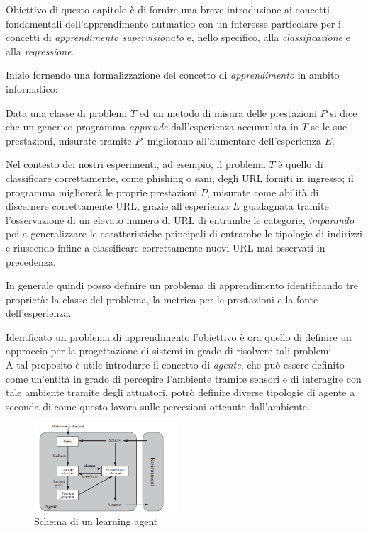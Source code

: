 \documentclass[../../main.tex]{subfiles}
\begin{document}
    Obiettivo di questo capitolo è di fornire una breve introduzione ai concetti fondamentali dell'apprendimento autmatico con un interesse particolare per i concetti di \textit{apprendimento supervisionato} e, nello specifico, alla \textit{classificazione} e alla \textit{regressione}.

    Inizio fornendo una formalizzazione del concetto di \textit{apprendimento} in ambito informatico:
    
    Data una classe di problemi $T$ ed un metodo di misura delle prestazioni $P$ si dice che un generico programma \textit{apprende} dall'esperienza accumulata in $T$ se le sue prestazioni, misurate tramite $P$, migliorano all'aumentare dell'esperienza $E$. \cite{Mitchell97}

    Nel contesto dei nostri esperimenti, ad esempio, il problema $T$ è quello di classificare correttamente, come phishing o sani, degli URL forniti in ingresso; il programma migliorerà le proprie prestazioni $P$, misurate come abilità di discernere correttamente URL, grazie all'esperienza  $E$ guadagnata tramite l'osservazione di un elevato numero di URL di entrambe le categorie, \textit{imparando} poi a generalizzare le caratteristiche principali di entrambe le tipologie di indirizzi e riuscendo infine a classificare correttamente nuovi URL mai osservati in precedenza.


    In generale quindi posso definire un problema di apprendimento identificando tre proprietà: la classe del problema, la metrica per le prestazioni e la fonte dell'esperienza.

    Identficato un problema di apprendimento l'obiettivo è ora quello di definire un approccio per la progettazione di sistemi in grado di risolvere tali problemi.\\
    A tal proposito è utile introdurre il concetto di \textit{agente}, che può essere definito come un'entità in grado di percepire l'ambiente tramite sensori e di interagire con tale ambiente tramite degli attuatori, potrò definire diverse tipologie di agente a seconda di come questo lavora sulle percezioni ottenute dall'ambiente.

    \begin{figure}
        \begin{center}
            \includegraphics[width = 0.48\textwidth]{immagini/4_0/learning_agent.png}
        \end{center}
        \caption{Schema di un learning agent \cite{russel2010}}
        \label{fig:learning_agent}
    \end{figure}
\end{document}
